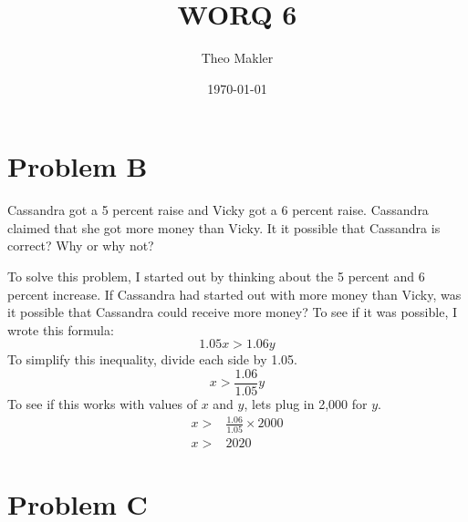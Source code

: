 \documentclass[a4paper]{article}
\title{WORQ 6}
\author{Theo Makler}
\date{\today}
\begin{document}
\maketitle

\section{Problem B}

Cassandra got a 5 percent raise and Vicky got a 6 percent raise. Cassandra claimed that she got more money than Vicky. It it possible that Cassandra is correct? Why or why not?

To solve this problem, I started out by thinking about the 5 percent and 6 percent increase. If Cassandra had started out with more money than Vicky, was it possible that Cassandra could receive more money? To see if it was possible, I wrote this formula:
$$1.05x > 1.06y$$
To simplify this inequality, divide each side by 1.05.
$$x > \frac{1.06}{1.05}y$$
To see if this works with values of $x$ and $y$, lets plug in 2,000 for $y$.
\begin{align}
x >& \frac{1.06}{1.05}\times2000\\
x >& 2020
\end{align}

\section{Problem C}
\end{document}
